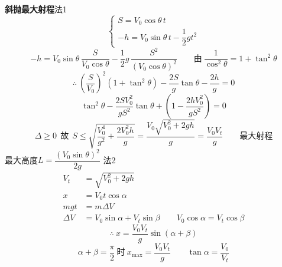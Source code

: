 \noindent \textbf{斜抛最大射程}\qquad 法1
\[ \begin{cases} S=V_0\cos\theta\,t\\ -h=V_0\sin\theta\,t-\dfrac12gt^2\end{cases} \]
\[ -h=V_0\sin\theta\,\frac{S}{V_0\cos\theta}-\frac12g\,\frac{S^2}{(V_0\cos\theta)^2}\qquad\text{由}\ \frac{1}{\cos^2\theta}=1+\tan^2\theta \]
\[ \therefore\ \left(\frac{S}{V_0}\right)^2(1+\tan^2\theta)-\frac{2S}{g}\tan\theta-\frac{2h}{g}=0 \]
\[ \tan^2\theta-\frac{2SV_0^2}{gS^2}\tan\theta+\left(1-\frac{2hV_0^2}{gS^2}\right)=0 \]
\[ \Delta\ge0\ \ \text{故}\ \ S\le\sqrt{\frac{V_0^4}{g^2}+\frac{2V_0^2h}{g}}=\frac{V_0\sqrt{V_0^2+2gh}}{g}=\frac{V_0V_t}{g}\qquad\text{最大射程} \]
\noindent 最大高度\quad $L=\dfrac{(V_0\sin\theta)^2}{2g}$
\noindent 法2
\begin{align*}
V_t&=\sqrt{V_0^2+2gh}\\
x&=V_0t\cos\alpha\\
mgt&=m\Delta V\\
\Delta V&=V_0\sin\alpha+V_t\sin\beta\qquad V_0\cos\alpha=V_t\cos\beta
\end{align*}
\[ \therefore\ x=\frac{V_0V_t}{g}\sin(\alpha+\beta) \]
\[ \alpha+\beta=\frac{\pi}{2}\ \text{时}\ x_{\max}=\frac{V_0V_t}{g}\qquad \tan\alpha=\frac{V_0}{V_t} \]
